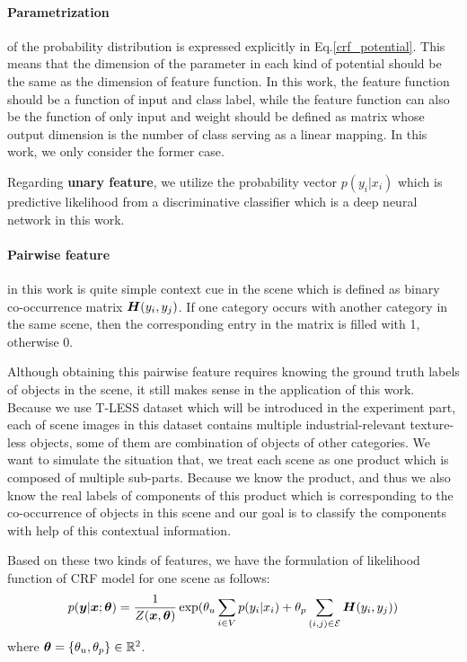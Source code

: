 \paragraph{Parametrization} of the probability distribution is expressed explicitly in Eq.\ref{crf_potential}. This means that the dimension of the parameter in each kind of potential should be the same as the dimension of feature function. In this work, the feature function should be a function of input and class label, while the feature function can also be the function of only input and weight should be defined as matrix whose output dimension is the number of class serving as a linear mapping. In this work, we only consider the former case.

Regarding \textbf{unary feature}, we utilize the probability vector $p(y_i|x_i)$ which is predictive likelihood from a discriminative classifier which is a deep neural network in this work. 

\paragraph{Pairwise feature} in this work is quite simple context cue in the scene which is defined as binary co-occurrence matrix $\boldsymbol H(y_i,y_j)$. If one category occurs with another category in the same scene, then the corresponding entry in the matrix is filled with 1, otherwise 0. 

Although obtaining this pairwise feature requires knowing the ground truth labels of objects in the scene, it still makes sense in the application of this work. Because we use T-LESS dataset which will be introduced in the experiment part, each of scene images in this dataset contains multiple industrial-relevant texture-less objects, some of them are combination of objects of other categories. We want to simulate the situation that, we treat each scene as one product which is composed of multiple sub-parts. Because we know the product, and thus we also know the real labels of components of this product which is corresponding to the co-occurrence of objects in this scene and our goal is to classify the components with help of this contextual information.

Based on these two kinds of features, we have the formulation of likelihood function of CRF model for one scene as follows:
\begin{equation}
\label{crf_used}
p(\boldsymbol y|\boldsymbol x; \boldsymbol \theta) = \frac{1}{Z(\boldsymbol x, \boldsymbol \theta)}\exp(\theta_u\sum_{i\in V}p(y_i|x_i) + \theta_p\sum_{(i,j)\in \mathcal{E}}\boldsymbol H(y_i,y_j))
\end{equation}
where $\boldsymbol \theta = \{\theta_u, \theta_p\} \in \mathbb{R}^2$.

